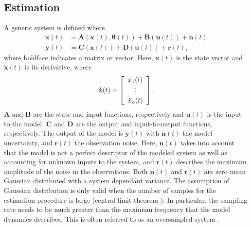 \subsection{Estimation}

A generic system is defined where \begin{align}
\label{eqn: NonlinEstS}
\mathbf{\dot{x}}(t) &= \mathbf{A}(\mathbf{x}(t),\mathbf{\theta}(t)) + \mathbf{B}(\mathbf{u}(t)) + \mathbf{n}(t)\\
\label{eqn: NonlinEstO}
\mathbf{y}(t)  &= \mathbf{C}(\mathbf{x}(t)) +\mathbf{D}(\mathbf{u}(t))+\mathbf{r}(t),
\end{align} where boldface indicates a matrix or vector. Here, $\mathbf{x}(t)$ is the state vector and $\dot{\mathbf{x}}(t)$ is its derivative, where
\[ \mathbf{\dot{x}}(t) = \left[ \begin{array}[pos]{c}
\dot{x}_{1}(t)\\
\vdots \\
\dot{x}_{n}(t) \end{array} \right] .\] $\mathbf{A}$ and $\mathbf{B}$ are the state and input functions, respectively and $\mathbf{u}(t)$ is the input to the model. $\mathbf{C}$ and $\mathbf{D}$ are the output and input-to-output functions, respectively. The output of the model is $\mathbf{y}(t)$ with $\mathbf{n}(t)$ the model uncertainty, and $\mathbf{r}(t)$ the observation noise. Here, $\mathbf{n}(t)$ takes into account that the model is not a perfect descriptor of the modeled system as well as accounting for unknown inputs to the system, and $\mathbf{r}(t)$ describes the maximum amplitude of the noise in the observations. Both $\mathbf{n}(t)$ and $\mathbf{r}(t)$ are zero mean Gaussian distributed with a system dependant variance. The assumption of Gaussian distribution is only valid when the number of samples for the estimation procedure is large (central limit theorem \iref). In particular, the sampling rate needs to be much greater than the maximum frequency that the model dynamics describes. This is often referred to as an oversampled system \iref.


